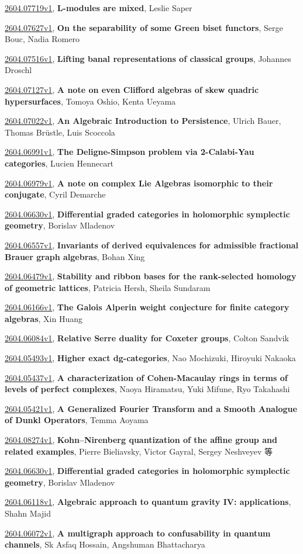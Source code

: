\documentclass[9pt, a4paper]{article}
\theoremstyle{plain}
\theoremstyle{definition}
\theoremstyle{remark}
\newcommand{\arxiv}[3]{\href{https://arxiv.org/abs/#1}{#1}, \textbf{\textcolor{arxivblue}{#2}}, #3}
\begin{document}
\arxiv{2604.07719v1}{L-modules are mixed}{Leslie Saper}

\arxiv{2604.07627v1}{On the separability of some Green biset functors}{Serge Bouc, Nadia Romero}

\arxiv{2604.07516v1}{Lifting banal representations of classical groups}{Johannes Droschl}

\arxiv{2604.07127v1}{A note on even Clifford algebras of skew quadric hypersurfaces}{Tomoya Oshio, Kenta Ueyama}

\arxiv{2604.07022v1}{An Algebraic Introduction to Persistence}{Ulrich Bauer, Thomas Brüstle, Luis Scoccola}

\arxiv{2604.06991v1}{The Deligne-Simpson problem via 2-Calabi-Yau categories}{Lucien Hennecart}

\arxiv{2604.06979v1}{A note on complex Lie Algebras isomorphic to their conjugate}{Cyril Demarche}

\arxiv{2604.06630v1}{Differential graded categories in holomorphic symplectic geometry}{Borislav Mladenov}

\arxiv{2604.06557v1}{Invariants of derived equivalences for admissible fractional Brauer graph algebras}{Bohan Xing}

\arxiv{2604.06479v1}{Stability and ribbon bases for the rank-selected homology of geometric lattices}{Patricia Hersh, Sheila Sundaram}

\arxiv{2604.06166v1}{The Galois Alperin weight conjecture for finite category algebras}{Xin Huang}

\arxiv{2604.06084v1}{Relative Serre duality for Coxeter groups}{Colton Sandvik}

\arxiv{2604.05493v1}{Higher exact dg-categories}{Nao Mochizuki, Hiroyuki Nakaoka}

\arxiv{2604.05437v1}{A characterization of Cohen-Macaulay rings in terms of levels of perfect complexes}{Naoya Hiramatsu, Yuki Mifune, Ryo Takahashi}

\arxiv{2604.05421v1}{A Generalized Fourier Transform and a Smooth Analogue of Dunkl Operators}{Temma Aoyama}

\arxiv{2604.08274v1}{Kohn--Nirenberg quantization of the affine group and related examples}{Pierre Bieliavsky, Victor Gayral, Sergey Neshveyev 等}

\arxiv{2604.06630v1}{Differential graded categories in holomorphic symplectic geometry}{Borislav Mladenov}

\arxiv{2604.06118v1}{Algebraic approach to quantum gravity IV: applications}{Shahn Majid}

\arxiv{2604.06072v1}{A multigraph approach to confusability in quantum channels}{Sk Asfaq Hossain, Angshuman Bhattacharya}

\end{document}

